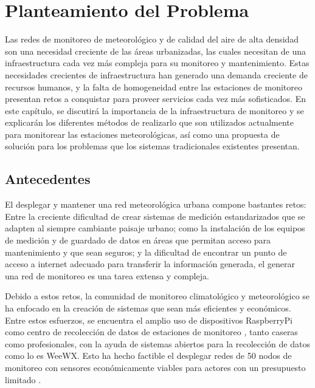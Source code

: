 \chapter{Planteamiento del Problema}

Las redes de monitoreo de meteorológico y de calidad del aire de alta densidad son una necesidad creciente de las áreas urbanizadas, las cuales necesitan de una infraestructura cada vez más compleja para su monitoreo y mantenimiento. Estas necesidades crecientes de infraestructura han generado una demanda creciente de recursos humanos, y la falta de homogeneidad entre las estaciones de monitoreo presentan retos a conquistar para proveer servicios cada vez más sofisticados. En este capítulo, se discutirá la importancia de la infraestructura de monitoreo y se explicarán los diferentes métodos de realizarlo que son utilizados actualmente para monitorear las estaciones meteorológicas, así como una propuesta de solución para los problemas que los sistemas tradicionales existentes presentan.

\section{Antecedentes}

El desplegar y mantener una red meteorológica urbana compone bastantes retos: Entre la creciente dificultad de crear sistemas de medición estandarizados que se adapten al siempre cambiante paisaje urbano; como la instalación de los equipos de medición y de guardado de datos en áreas que permitan acceso para mantenimiento y que sean seguros; y la dificultad de encontrar un punto de acceso a internet adecuado para transferir la información generada, el generar una red de monitoreo es una tarea extensa y compleja.

Debido a estos retos, la comunidad de monitoreo climatológico y meteorológico se ha enfocado en la creación de sistemas que sean más eficientes y económicos. Entre estos esfuerzos, se encuentra el amplio uso de dispositivos RaspberryPi como centro de recolección de datos de estaciones de monitoreo \cite{rpi_weataher_station}, tanto caseras como profesionales, con la ayuda de sistemas abiertos para la recolección de datos como lo es WeeWX. Esto ha hecho factible el desplegar redes de 50 nodos de monitoreo con sensores económicamente viables para actores con un presupuesto limitado \cite{monitoreo_raspberry_nagios}.


